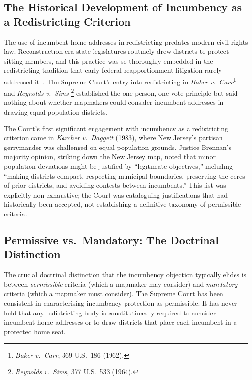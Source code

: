\label{sec:background}

\subsection{The Historical Development of Incumbency as a Redistricting Criterion}

The use of incumbent home addresses in redistricting predates modern civil rights law.
Reconstruction-era state legislatures routinely drew districts to protect sitting members,
and this practice was so thoroughly embedded in the redistricting tradition that early
federal reapportionment litigation rarely addressed it~\citep{backstrom1978problems}.
The Supreme Court's entry into redistricting in \textit{Baker v.\ Carr}\footnote{
\textit{Baker v.\ Carr}, 369 U.S.\ 186 (1962).} and \textit{Reynolds v.\ Sims}
\footnote{\textit{Reynolds v.\ Sims}, 377 U.S.\ 533 (1964).} established the one-person,
one-vote principle but said nothing about whether mapmakers could consider incumbent
addresses in drawing equal-population districts.

The Court's first significant engagement with incumbency as a redistricting criterion
came in \textit{Karcher v.\ Daggett} (1983), where New Jersey's partisan gerrymander
was challenged on equal population grounds. Justice Brennan's majority opinion, striking
down the New Jersey map, noted that minor population deviations might be justified by
``legitimate objectives,'' including ``making districts compact, respecting municipal
boundaries, preserving the cores of prior districts, and avoiding contests between
incumbents.'' This list was explicitly non-exhaustive; the Court was cataloguing
justifications that had historically been accepted, not establishing a definitive taxonomy
of permissible criteria.

\subsection{Permissive vs.\ Mandatory: The Doctrinal Distinction}

The crucial doctrinal distinction that the incumbency objection typically elides is
between \textit{permissible} criteria (which a mapmaker may consider) and
\textit{mandatory} criteria (which a mapmaker must consider). The Supreme Court has
been consistent in characterising incumbency protection as permissible. It has never
held that any redistricting body is constitutionally required to consider incumbent
home addresses or to draw districts that place each incumbent in a protected home seat.

